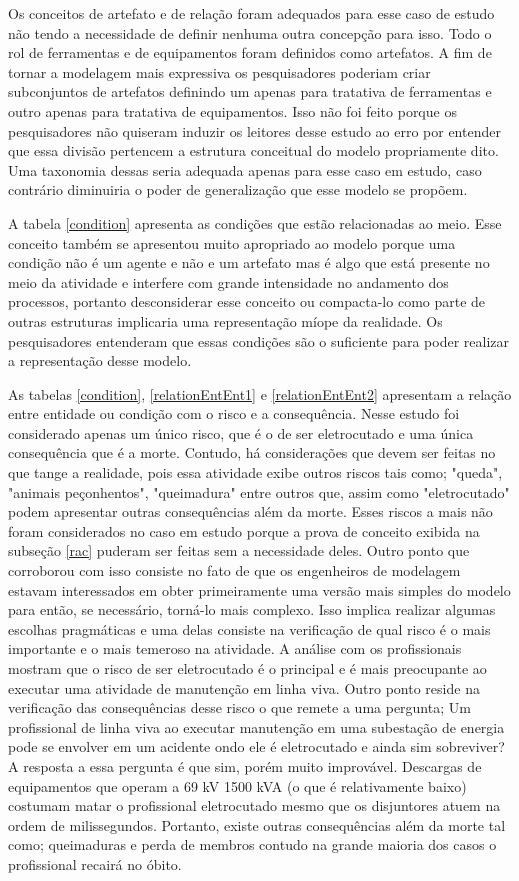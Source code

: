 Os conceitos de artefato e de relação foram adequados para esse caso de estudo não tendo a necessidade de definir nenhuma outra concepção para isso. Todo o rol de ferramentas e de equipamentos 
foram definidos como artefatos. A fim de tornar a modelagem mais expressiva os pesquisadores poderiam criar subconjuntos de artefatos definindo um apenas para tratativa de ferramentas e outro 
apenas para tratativa de equipamentos. Isso não foi feito porque os pesquisadores não quiseram induzir os leitores desse estudo ao erro por entender que essa divisão pertencem a estrutura conceitual 
do modelo propriamente dito. Uma taxonomia dessas seria adequada apenas para esse caso em estudo, caso contrário diminuiria o poder de generalização que esse modelo se propõem. 

A tabela \ref{condition} apresenta as condições que estão relacionadas ao meio. Esse conceito também se apresentou muito apropriado ao modelo porque uma condição não é um agente e não e um artefato 
mas é algo que está presente no meio da atividade e interfere com grande intensidade no andamento dos processos, portanto desconsiderar esse conceito ou compacta-lo como parte de outras estruturas 
implicaria uma representação míope da realidade. Os pesquisadores entenderam que essas condições são o suficiente para poder realizar a representação desse modelo.

As tabelas \ref{condition}, \ref{relationEntEnt1} e \ref{relationEntEnt2} apresentam a relação entre entidade ou condição com o risco e a consequência. Nesse estudo foi considerado apenas um 
único risco, que é o de ser eletrocutado e uma única consequência que é a morte. Contudo, há considerações que devem ser feitas no que tange a realidade, pois essa atividade exibe outros 
riscos tais como; "queda", "animais peçonhentos", "queimadura" entre outros que, assim como "eletrocutado" podem apresentar outras consequências além da morte. Esses riscos a mais não foram 
considerados no caso em estudo porque a prova de conceito exibida na subseção \ref{rac} puderam ser feitas sem a necessidade deles. Outro ponto que corroborou com isso consiste no fato 
de que os engenheiros de modelagem estavam interessados em obter primeiramente uma versão mais simples do modelo para então, se necessário, torná-lo mais complexo. Isso implica realizar 
algumas escolhas pragmáticas e uma delas consiste na verificação de qual risco é o mais importante e o mais temeroso na atividade. A análise com os profissionais mostram que o risco de 
ser eletrocutado é o principal e é mais preocupante ao executar uma atividade de manutenção em linha viva. Outro ponto reside na verificação das consequências desse risco o que remete 
a uma pergunta; Um profissional de linha viva ao executar manutenção em uma subestação de energia pode se envolver em um acidente ondo ele é eletrocutado e ainda sim sobreviver? A resposta 
a essa pergunta é que sim, porém muito improvável. Descargas de equipamentos que operam a 69 kV 1500 kVA  (o que é relativamente baixo) costumam matar o profissional eletrocutado mesmo que 
os disjuntores atuem na ordem de milissegundos. Portanto, existe outras consequências além da morte tal como; queimaduras e perda de membros contudo na grande maioria dos casos o profissional 
recairá no óbito. 

